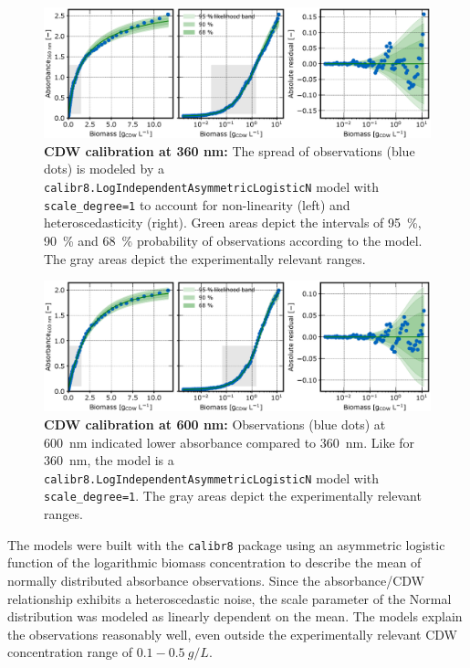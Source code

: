 \documentclass[sn-standardnature]{sn-jnl}%
\theoremstyle{thmstyleone}%
\theoremstyle{thmstyletwo}%
\theoremstyle{thmstylethree}%
\begin{document}
\begin{figure}[H]
    \centering
    \includegraphics[width=1.0\textwidth]{figures/Fig6.eps}
    \caption{
        \textbf{CDW calibration at 360 nm:}
        The spread of observations (blue dots) is modeled by a \texttt{calibr8.LogIndependentAsymmetricLogisticN} model with \texttt{scale\_degree=1} to account for non-linearity (left) and heteroscedasticity (right). 
        Green areas depict the intervals of 95~\%, 90~\% and 68~\% probability of observations according to the model.
        The gray areas depict the experimentally relevant ranges.
    }
    \label{fig_cmXA360}
\end{figure}

\begin{figure}[H]
    \centering
    \includegraphics[width=1.0\textwidth]{figures/Fig7.eps}
    \caption{
        \textbf{CDW calibration at 600 nm:}
        Observations (blue dots) at 600~nm indicated lower absorbance compared to 360~nm. Like for 360~nm, the model is a \texttt{calibr8.LogIndependentAsymmetricLogisticN} model with \texttt{scale\_degree=1}.
        The gray areas depict the experimentally relevant ranges.
    }
    \label{fig_cmXA600}
\end{figure}

The models were built with the \texttt{calibr8} package \cite{calibr8,calibr8Paper} using an asymmetric logistic function of the logarithmic biomass concentration to describe the mean of normally distributed absorbance observations.
Since the absorbance/CDW relationship exhibits a heteroscedastic noise, the scale parameter of the Normal distribution was modeled as linearly dependent on the mean.
The models explain the observations reasonably well, even outside the experimentally relevant CDW concentration range of $0.1-0.5~g/L$.
\end{document}
